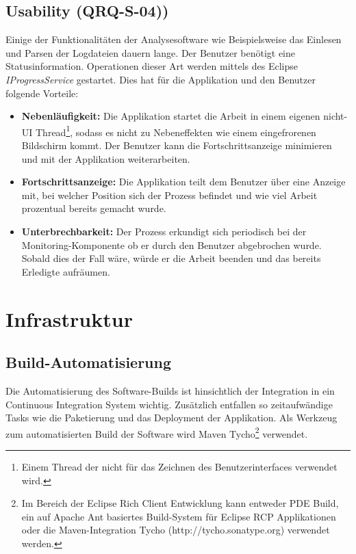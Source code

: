\subsection{Usability (QRQ-S-04))}
Einige der Funktionalitäten der Analysesoftware wie Beispielsweise das Einlesen und Parsen der Logdateien dauern lange. Der Benutzer benötigt eine Statusinformation. Operationen dieser Art werden mittels des Eclipse \textit{IProgressService} gestartet. Dies hat für die Applikation und den Benutzer folgende Vorteile:
\begin{itemize}
	\item \textbf{Nebenläufigkeit:} Die Applikation startet die Arbeit in einem eigenen nicht-UI Thread\footnote{Einem Thread der nicht für das Zeichnen des Benutzerinterfaces verwendet wird.}, sodass es nicht zu Nebeneffekten wie einem eingefrorenen Bildschirm kommt. Der Benutzer kann die Fortschrittsanzeige minimieren und mit der Applikation weiterarbeiten.
	\item \textbf{Fortschrittsanzeige: } Die Applikation teilt dem Benutzer über eine Anzeige mit, bei welcher Position sich der Prozess befindet und wie viel Arbeit prozentual bereits gemacht wurde.
	\item \textbf{Unterbrechbarkeit: } Der Prozess erkundigt sich periodisch bei der Monitoring-Komponente ob er durch den Benutzer abgebrochen wurde. Sobald dies der Fall wäre, würde er die Arbeit beenden und das bereits Erledigte aufräumen.
\end{itemize}

\section{Infrastruktur}
\subsection{Build-Automatisierung}
Die Automatisierung des Software-Builds ist hinsichtlich der Integration in ein Continuous Integration System wichtig. Zusätzlich entfallen so zeitaufwändige Tasks wie die Paketierung und das Deployment der Applikation.
Als Werkzeug zum automatisierten Build der Software wird Maven Tycho\footnote{Im Bereich der Eclipse Rich Client Entwicklung kann entweder PDE Build, ein auf Apache Ant basiertes Build-System für Eclipse RCP Applikationen\cite{vogelZapfPdeBuild} oder die Maven-Integration Tycho (http://tycho.sonatype.org) verwendet werden.} verwendet.

